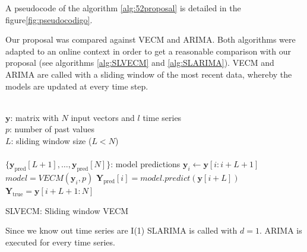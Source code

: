 {
}
A pseudocode of the algorithm \ref{alg:52proposal} is detailed in the figure\ref{fig:pseudocodigo}.

Our proposal was compared against VECM and ARIMA. Both algorithms were adapted
to an online context in order to get a reasonable comparison with our proposal
(see algorithms \ref{alg:SLVECM} and \ref{alg:SLARIMA}). VECM and ARIMA are
called with a sliding window of the most recent data, whereby the models are
updated at every time step.

\begin{algorithm}[ht]
\begin{algorithmic}[1]
\REQUIRE $\,$ \\
$\mathbf{y}$: matrix with $N$ input vectors and $l$ time series\\
$p$: number of past values \\
$L$: sliding window size ($L<N$) \\
\ENSURE  $\,$ \\
$\{ \mathbf{y}_{\text{pred}}[L+1],\dots,\mathbf{y}_{\text{pred}}[N]\}$: model predictions 
    \STATE $\mathbf{y}_i \gets \mathbf{y}[i:i+L+1]$
        \STATE $model = VECM(\mathbf{y}_i, p)$
        \STATE $\mathbf{Y}_{\text{pred}}[i] = model.predict(\mathbf{y}[i+L])$
\ENDFOR
\STATE $\mathbf{Y}_{\text{true}} = \mathbf{y}[i+L+1:N] $
\end{algorithmic}
\caption{SLVECM: Sliding window VECM}
\label{alg:SLVECM}
\end{algorithm}

Since we know out time series are I(1) SLARIMA is called with $d=1$. ARIMA is
executed for every time series. 

